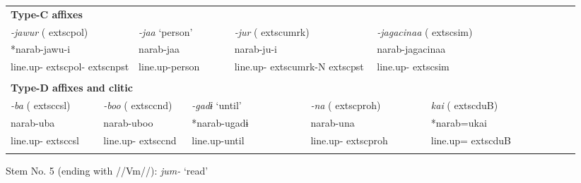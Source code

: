 \begin{tabularx}{\textwidth}{XXXXXXXXXm{}XXXXXXXXXXXX}
\multicolumn{22}{X}{{\bfseries Type-C affixes}}\\
\multicolumn{4}{X}{{ \textit{{}-jawur} (	extsc{pol})}} & \multicolumn{2}{X}{{ \textit{{}-jaa} ‘person’}} & \multicolumn{4}{X}{{ \textit{{}-jur} (	extsc{umrk})}} & \multicolumn{4}{X}{{ \textit{{}-jagacinaa} (	extsc{sim})}} & \multicolumn{8}{X}{}\\
\multicolumn{4}{X}{{ *narab-jawu-i}} & \multicolumn{2}{X}{{ narab-jaa}} & \multicolumn{4}{X}{narab-ju-i} & \multicolumn{4}{X}{{ narab-jagacinaa}} & \multicolumn{8}{X}{}\\
\multicolumn{4}{X}{line.up-	extsc{pol}-	extsc{npst}} & \multicolumn{2}{X}{line.up-person} & \multicolumn{4}{X}{line.up-	extsc{umrk}-N	extsc{pst}} & \multicolumn{4}{X}{line.up-	extsc{sim}} & \multicolumn{8}{X}{}\\
\multicolumn{22}{X}{}\\
\multicolumn{22}{X}{{\bfseries Type-D affixes and clitic}}\\
\multicolumn{2}{X}{{ \textit{{}-ba} (	extsc{csl})}} & \multicolumn{3}{X}{{ \textit{{}-boo} (	extsc{cnd})}} & \multicolumn{3}{X}{{ \textit{{}-gadɨ} ‘until’}} & \multicolumn{4}{X}{{ \textit{{}-na} (	extsc{proh})}} & \multicolumn{4}{X}{{ \textit{kai} (	extsc{du}B)}} & \multicolumn{6}{X}{}\\
\multicolumn{2}{X}{{ narab-uba}} & \multicolumn{3}{X}{{ narab-uboo}} & \multicolumn{3}{X}{{ *narab-ugadɨ}} & \multicolumn{4}{X}{{ narab-una}} & \multicolumn{4}{X}{{ *narab=ukai}} & \multicolumn{6}{X}{}\\
\multicolumn{2}{X}{line.up-	extsc{csl}} & \multicolumn{3}{X}{line.up-	extsc{cnd}} & \multicolumn{3}{X}{line.up-until} & \multicolumn{4}{X}{line.up-	extsc{proh}} & \multicolumn{4}{X}{line.up=	extsc{du}B} & \multicolumn{6}{X}{}\\
\lspbottomrule
\end{tabularx}
Stem No. 5 (ending with //Vm//): \textit{jum-} ‘read’

\tablefirsthead{}

